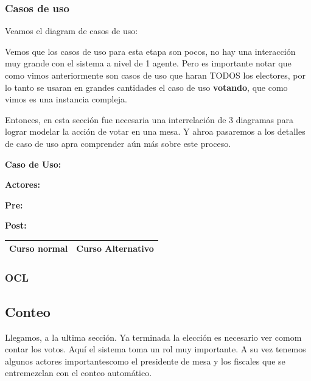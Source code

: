 \subsubsection{Casos de uso}

Veamos el diagram de casos de uso:



Vemos que los casos de uso para esta etapa son pocos, no hay una interacción muy grande con el sistema a nivel de 1 agente. Pero es importante notar que como vimos anteriormente son casos de uso que haran TODOS los electores, por lo tanto se usaran en grandes cantidades el caso de uso \textbf{votando}, que como vimos es una instancia compleja.

Entonces, en esta sección fue necesaria una interrelación de 3 diagramas para lograr modelar la acción de votar en una mesa. Y ahroa pasaremos a los detalles de caso de uso apra comprender aún más sobre este proceso.


\textbf{Caso de Uso: }

\textbf{Actores:} 

\textbf{Pre:} 

\textbf{Post:}
\begin{table}[h!]
	
 \begin{tabular}{|p{7.5cm} | p{7.5cm}|} 
 \hline
 \textbf{Curso normal} & \textbf{Curso Alternativo} \\
 \hline

 \end{tabular}

\end{table}


\subsubsection{OCL}

\subsection{Conteo}

Llegamos, a la ultima sección. Ya terminada la elección es necesario ver comom contar los votos. Aquí el sistema toma un rol muy importante. A su vez tenemos algunos actores importantescomo el presidente de mesa y los fiscales que se entremezclan con el conteo automático.

